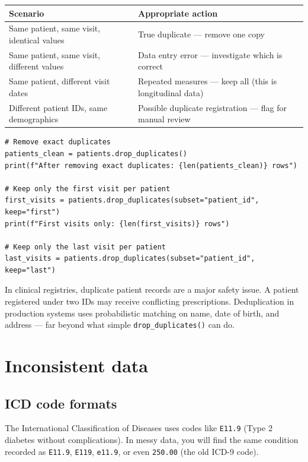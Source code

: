 \begin{center}
\begin{tabular}{lp{8cm}}
\toprule
\textbf{Scenario} & \textbf{Appropriate action} \\
\midrule
Same patient, same visit, identical values & True duplicate --- remove one copy \\
Same patient, same visit, different values & Data entry error --- investigate which is correct \\
Same patient, different visit dates & Repeated measures --- keep all (this is longitudinal data) \\
Different patient IDs, same demographics & Possible duplicate registration --- flag for manual review \\
\bottomrule
\end{tabular}
\end{center}

\begin{verbatim}
# Remove exact duplicates
patients_clean = patients.drop_duplicates()
print(f"After removing exact duplicates: {len(patients_clean)} rows")

# Keep only the first visit per patient
first_visits = patients.drop_duplicates(subset="patient_id", keep="first")
print(f"First visits only: {len(first_visits)} rows")

# Keep only the last visit per patient
last_visits = patients.drop_duplicates(subset="patient_id", keep="last")
\end{verbatim}

\begin{clinicalnote}
In clinical registries, duplicate patient records are a major safety issue. A patient registered under two IDs may receive conflicting prescriptions. Deduplication in production systems uses probabilistic matching on name, date of birth, and address --- far beyond what simple \texttt{drop\_duplicates()} can do.
\end{clinicalnote}

\section{Inconsistent data}

\subsection{ICD code formats}

The International Classification of Diseases uses codes like \texttt{E11.9} (Type 2 diabetes without complications). In messy data, you will find the same condition recorded as \texttt{E11.9}, \texttt{E119}, \texttt{e11.9}, or even \texttt{250.00} (the old ICD-9 code).

